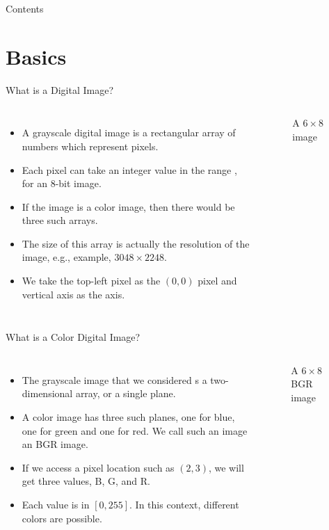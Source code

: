 \begin{frame}{Contents}
\tableofcontents
\end{frame}

\section{Basics}

\begin{frame}[t,fragile]{What is a Digital Image?}
    \begin{columns}[t]
        \begin{itemize}
            \item A grayscale digital image is a rectangular array of numbers which represent pixels.
            \item Each pixel can take an integer  value in the range \fillblank{ $[0, 255]$ }, for an 8-bit image.
            \item If the image is a color image, then there would be three such arrays.
            \item The size of this array is actually the resolution of the image, e.g., example, $3048\times2248$.
            \item We take the top-left pixel as the $(0,0)$ pixel and vertical axis as the  axis.
        \end{itemize}
            \begin{figure}
              \centering
                
              \caption{A $6\times 8$ image}
            \end{figure}
    \end{columns}

\end{frame}


\begin{frame}[t,fragile]{What is a Color Digital Image?}
    \begin{columns}[t]
        \begin{itemize}
            \item The grayscale image that we considered s a two-dimensional array, or a single plane.
            \item A color image has three such planes, one for blue, one for green and one for red. We call such an image an BGR image.
            \item If we access a pixel location such as $(2,3)$, we will get three values, B, G, and R.
            \item Each value is in $[0,255]$. In this context,  different colors are possible.
        \end{itemize}
            \begin{figure}
              \centering
                
              \caption{A $6\times 8$ BGR image}
            \end{figure}
    \end{columns}

\end{frame}


